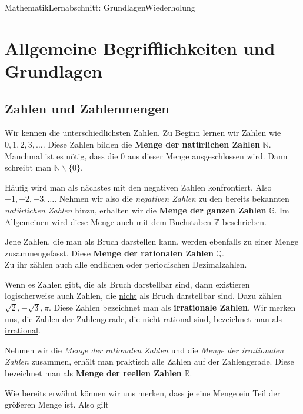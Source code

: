 \documentclass[11pt,twocolumn,oneside,openany,headings=optiontotoc,11pt,numbers=noenddot]{article}
\begin{document}
	\begin{worksheet}{Mathematik}{Lernabschnitt: Grundlagen}{Wiederholung}
		\section{Allgemeine Begrifflichkeiten und Grundlagen}
		\subsection{Zahlen und Zahlenmengen}
		Wir kennen die unterschiedlichsten Zahlen. Zu Beginn lernen wir Zahlen wie  \(0,1,2,3,\ldots\). Diese Zahlen bilden die \textbf{Menge der natürlichen Zahlen} \(\mathbb{N}\). Manchmal ist es nötig, dass die \(0\) aus dieser Menge ausgeschlossen wird. Dann schreibt man \(\mathbb{N}\backslash\{0\}\).\\
		\par\noindent
		Häufig wird man als nächstes mit den negativen Zahlen konfrontiert. Also \(-1,-2,-3,\ldots\). Nehmen wir also die \textit{negativen Zahlen} zu den bereits bekannten \textit{natürlichen Zahlen} hinzu, erhalten wir die \textbf{Menge der ganzen Zahlen} \(\mathbb{G}\). Im Allgemeinen wird diese Menge auch mit dem Buchstaben \(\mathbb{Z}\) beschrieben.\\
		\par\noindent
		Jene Zahlen, die man als Bruch darstellen kann, werden ebenfalls zu einer Menge zusammengefasst. Diese \textbf{Menge der rationalen Zahlen} \(\mathbb{Q}\).\\
		Zu ihr zählen auch alle endlichen oder periodischen Dezimalzahlen.\\
		\par\noindent
		Wenn es Zahlen gibt, die als Bruch darstellbar sind, dann existieren logischerweise auch Zahlen, die \underline{nicht} als Bruch darstellbar sind. Dazu zählen \(\sqrt{2}, -\sqrt{3}, \pi \). Diese Zahlen bezeichnet man als \textbf{irrationale Zahlen}. Wir merken uns, die Zahlen der Zahlengerade, die \underline{nicht rational} sind, bezeichnet man als \underline{irrational}.\\
		\par\noindent
		Nehmen wir die \textit{Menge der rationalen Zahlen} und die \textit{Menge der irrationalen Zahlen} zusammen, erhält man praktisch alle Zahlen auf der Zahlengerade. Diese bezeichnet man als \textbf{Menge der reellen Zahlen} \(\mathbb{R}\).\\
		\par\noindent
		Wie bereits erwähnt können wir uns merken, dass je eine Menge ein Teil der größeren Menge ist. Also gilt

\end{worksheet}
\end{document}
